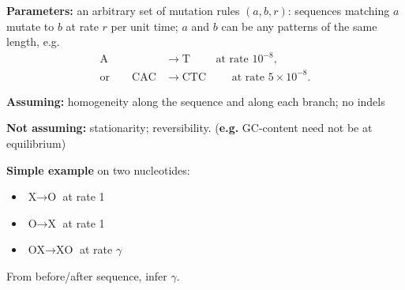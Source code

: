 \documentclass[fontscale=0.38]{baposter}
\newcommand{\nA}{\mbox{A}}
\newcommand{\nC}{\mbox{C}}
\newcommand{\nT}{\mbox{T}}
\begin{document}
\begin{poster}
{    \textbf{Parameters:} an arbitrary set of mutation rules $(a,b,r)$: 
    sequences matching $a$ mutate to $b$ at rate $r$ per unit time;
    $a$ and $b$ can be any patterns of the same length,
    e.g.
    \begin{align*}
        \nA &\longrightarrow \nT \qquad \text{ at rate } 10^{-8} , \\
        \text{or} \qquad       \nC\nA\nC &\longrightarrow \nC\nT\nC \qquad \text{ at rate } 5\times 10^{-8} .
  \end{align*}

% 


    \vspace{1em}

    \textbf{Assuming:}
    homogeneity along the sequence and along each branch; no indels
    \vspace{.5em}

    \textbf{Not assuming:}
    stationarity;
    reversibility.
    (\textbf{e.g.} GC-content need not be at equilibrium)



  \parbox[b]{.4\textwidth}{

    \textbf{Simple example} on two nucleotides:
      \begin{itemize}
        \item $\text{X} \to \text{O}$ at rate 1
        \item $\text{O} \to \text{X}$ at rate 1
        \item $\text{OX} \to \text{XO}$ at rate $\gamma$
      \end{itemize}
      From before/after sequence, infer $\gamma$.

  }\parbox[b]{.3\textwidth}{

}}
\end{poster}
\end{document}
